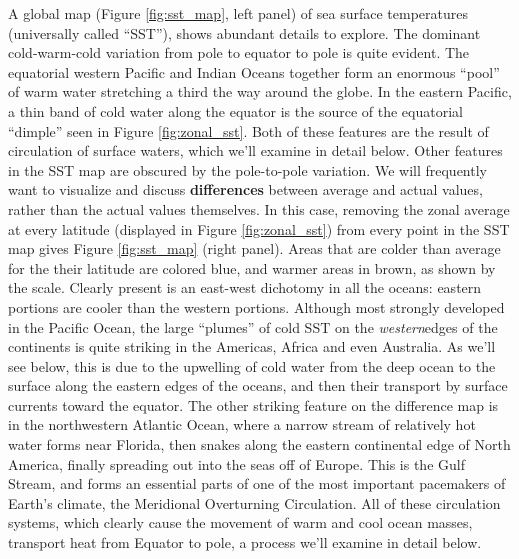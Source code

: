 \documentclass[amstex,12pt]{book}
\begin{document}
A global map (Figure \ref{fig:sst_map}, left panel) of sea surface temperatures (universally called ``SST''), shows abundant details to explore. The dominant cold-warm-cold variation from pole to equator to pole is quite evident. The equatorial western Pacific and Indian Oceans together form an enormous ``pool'' of warm water stretching a third the way around the globe. In the eastern Pacific, a thin band of cold water along the equator is the source of the equatorial ``dimple'' seen in Figure \ref{fig:zonal_sst}. Both of these features are the result of circulation of surface waters, which we'll examine in detail below. Other features in the SST map are obscured by the pole-to-pole variation. We will frequently want to visualize and discuss \textbf{differences} between average and actual values, rather than the actual values themselves. In this case, removing the zonal average at every latitude (displayed in Figure \ref{fig:zonal_sst}) from every  point in the SST map gives Figure \ref{fig:sst_map} (right panel). Areas that are colder than average for the their latitude are colored blue, and warmer areas in brown, as shown by the scale. Clearly present is an east-west dichotomy in all the oceans: eastern portions are cooler than the western portions. Although most strongly developed in the Pacific Ocean, the large ``plumes'' of cold SST on the \emph{western}edges of the continents is quite striking in the Americas, Africa and even Australia. As we'll see below, this is due to the upwelling of cold water from the deep ocean to the surface along the eastern edges of the oceans, and then their transport by surface currents toward the equator. The other striking feature on the difference map is in the northwestern Atlantic Ocean, where a narrow stream of relatively hot water forms near Florida, then snakes along the eastern continental edge of North America, finally spreading out into the seas off of Europe. This is the Gulf Stream, and forms an essential parts of one of the most important pacemakers of Earth's climate, the Meridional Overturning Circulation. All of these circulation systems, which clearly cause the movement of warm and cool ocean masses, transport heat from Equator to pole, a process we'll examine in detail below. 
\end{document}
